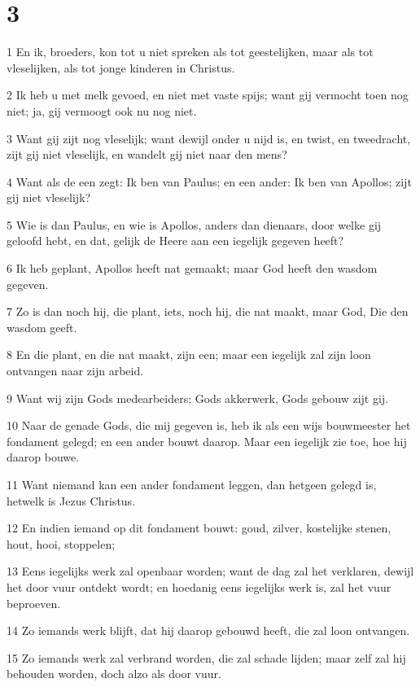 \chapter{3}

\par 1 En ik, broeders, kon tot u niet spreken als tot geestelijken, maar als tot vleselijken, als tot jonge kinderen in Christus.
\par 2 Ik heb u met melk gevoed, en niet met vaste spijs; want gij vermocht toen nog niet; ja, gij vermoogt ook nu nog niet.
\par 3 Want gij zijt nog vleselijk; want dewijl onder u nijd is, en twist, en tweedracht, zijt gij niet vleselijk, en wandelt gij niet naar den mens?
\par 4 Want als de een zegt: Ik ben van Paulus; en een ander: Ik ben van Apollos; zijt gij niet vleselijk?
\par 5 Wie is dan Paulus, en wie is Apollos, anders dan dienaars, door welke gij geloofd hebt, en dat, gelijk de Heere aan een iegelijk gegeven heeft?
\par 6 Ik heb geplant, Apollos heeft nat gemaakt; maar God heeft den wasdom gegeven.
\par 7 Zo is dan noch hij, die plant, iets, noch hij, die nat maakt, maar God, Die den wasdom geeft.
\par 8 En die plant, en die nat maakt, zijn een; maar een iegelijk zal zijn loon ontvangen naar zijn arbeid.
\par 9 Want wij zijn Gods medearbeiders; Gods akkerwerk, Gods gebouw zijt gij.
\par 10 Naar de genade Gods, die mij gegeven is, heb ik als een wijs bouwmeester het fondament gelegd; en een ander bouwt daarop. Maar een iegelijk zie toe, hoe hij daarop bouwe.
\par 11 Want niemand kan een ander fondament leggen, dan hetgeen gelegd is, hetwelk is Jezus Christus.
\par 12 En indien iemand op dit fondament bouwt: goud, zilver, kostelijke stenen, hout, hooi, stoppelen;
\par 13 Eens iegelijks werk zal openbaar worden; want de dag zal het verklaren, dewijl het door vuur ontdekt wordt; en hoedanig eens iegelijks werk is, zal het vuur beproeven.
\par 14 Zo iemands werk blijft, dat hij daarop gebouwd heeft, die zal loon ontvangen.
\par 15 Zo iemands werk zal verbrand worden, die zal schade lijden; maar zelf zal hij behouden worden, doch alzo als door vuur.
